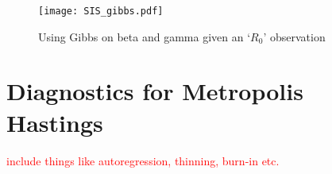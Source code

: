 \begin{figure}[htbp]
    \centering
    \texttt{[image: SIS\_gibbs.pdf]}
    \caption{Using Gibbs on beta and gamma given an `$R_0$' observation}
    \label{fig:gibbs_R}
\end{figure}

\section{Diagnostics for Metropolis Hastings}
\textcolor{red}{include things like autoregression, thinning, burn-in etc.}
